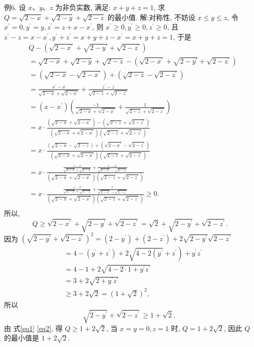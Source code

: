 例6. 设 $x 、 y 、 z$ 为非负实数, 满足: $x+y+z=1$, 求 $Q=\sqrt{2-x}+ \sqrt{2-y}+\sqrt{2-z}$ 的最小值.
解:对称性, 不妨设 $x \leqslant y \leqslant z$, 令 $x^{\prime}=0, y^{\prime}=y, z^{\prime}=z+x-x^{\prime}$, 则 $x^{\prime} \geqslant 0, y^{\prime} \geqslant 0, z^{\prime} \geqslant 0$, 且 $z^{\prime}-z=x-x^{\prime}, y^{\prime}+z^{\prime}=x+y+z-x^{\prime}=x+y+z=1$, 于是
$$
\begin{aligned}
& Q-\left(\sqrt{2-x^{\prime}}+\sqrt{2-y^{\prime}}+\sqrt{2-z^{\prime}}\right) \\
& =\sqrt{2-x}+\sqrt{2-y}+\sqrt{2-z}-\left(\sqrt{2-x^{\prime}}+\sqrt{2-y^{\prime}}+\sqrt{2-z^{\prime}}\right) \\
& =\left(\sqrt{2-x}-\sqrt{2-x^{\prime}}\right)+\left(\sqrt{2-z}-\sqrt{2-z^{\prime}}\right) \\
& =\frac{x^{\prime}-x}{\sqrt{2-x}+\sqrt{2-x^{\prime}}}+\frac{z^{\prime}-z}{\sqrt{2-z}+\sqrt{2-z^{\prime}}} \\
& =\left(x-x^{\prime}\right)\left(\frac{-1}{\sqrt{2-x}+\sqrt{2-x^{\prime}}}+\frac{1}{\sqrt{2-z}+\sqrt{2-z^{\prime}}}\right) \\
& =x \cdot \frac{\left(\sqrt{2-x}+\sqrt{2-x^{\prime}}\right)-\left(\sqrt{2-z}+\sqrt{2-z^{\prime}}\right)}{\left(\sqrt{2-x}+\sqrt{2-x^{\prime}}\right)\left(\sqrt{2-z}+\sqrt{2-z^{\prime}}\right)} \\
& =x \cdot \frac{(\sqrt{2-x}-\sqrt{2-z})+\left(\sqrt{2-x^{\prime}}-\sqrt{2-z^{\prime}}\right)}{\left(\sqrt{2-x}+\sqrt{2-x^{\prime}}\right)\left(\sqrt{2-z}+\sqrt{2-z^{\prime}}\right)} \\
& =x \cdot \frac{\frac{z-x}{\sqrt{2-x}+\sqrt{2-z}}+\frac{z^{\prime}-x^{\prime}}{\sqrt{2-x^{\prime}}-\sqrt{2-z^{\prime}}}}{\left(\sqrt{2-x}+\sqrt{2-x^{\prime}}\right)\left(\sqrt{2-z}+\sqrt{2-z^{\prime}}\right)} \\
& =x \cdot \frac{\frac{z-x}{\sqrt{2-x}+\sqrt{2-z}}+\frac{z^{\prime}}{\sqrt{2-x^{\prime}}-\sqrt{2-z^{\prime}}}}{\left(\sqrt{2-x}+\sqrt{2-x^{\prime}}\right)\left(\sqrt{2-z}+\sqrt{2-z^{\prime}}\right)} \geqslant 0 . \\
&
\end{aligned}
$$
所以,
$$
Q \geqslant \sqrt{2-x^{\prime}}+\sqrt{2-y^{\prime}}+\sqrt{2-z^{\prime}}=\sqrt{2}+\sqrt{2-y^{\prime}}+\sqrt{2-z^{\prime}} . \label{eq1}
$$
因为 $\left(\sqrt{2-y^{\prime}}+\sqrt{2-z^{\prime}}\right)^2=\left(2-y^{\prime}\right)+\left(2-z^{\prime}\right)+2 \sqrt{2-y^{\prime}} \sqrt{2-z^{\prime}}$
$$
\begin{aligned}
& \left.=4-\left(y^{\prime}+z^{\prime}\right)+2 \sqrt{4-2\left(y^{\prime}\right.}+z^{\prime}\right)+y^{\prime} z^{\prime} \\
& =4-1+2 \sqrt{4-2 \cdot 1+y^{\prime} z^{\prime}} \\
& =3+2 \sqrt{2+y^{\prime} z^{\prime}} \\
& \geqslant 3+2 \sqrt{2}=(1+\sqrt{2})^2,
\end{aligned}
$$
所以
$$
\sqrt{2-y^{\prime}}+\sqrt{2-z^{\prime}} \geqslant 1+\sqrt{2} \text {. } \label{eq2}
$$
由 式\ref{eq1} \ref{eq2}, 得 $Q \geqslant 1+2 \sqrt{2}$, 当 $x=y=0, z=1$ 时, $Q=1+2 \sqrt{2}$, 因此 $Q$ 的最小值是 $1+2 \sqrt{2}$.


